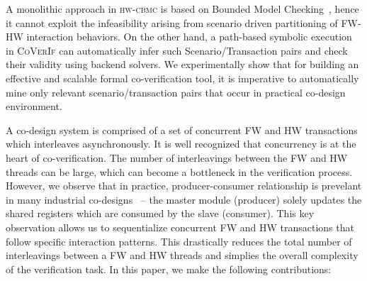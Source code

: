 \documentclass[sigconf]{acmart}
\newcommand{\tool}[1]{\textsc{#1}\xspace}
\newcommand{\hwcbmcv}{\tool{hw-cbmc}}
\newcommand{\verifox}{\tool{CoVerIf}}
\begin{document}
A monolithic approach in \hwcbmcv is based on Bounded Model Checking~\cite{CKY03}, 
hence it cannot exploit the infeasibility arising from scenario driven
partitioning of FW-HW interaction behaviors.  On the other hand, a 
path-based symbolic execution in \verifox can automatically infer 
such Scenario/Transaction pairs and check their validity using backend 
solvers.  We experimentally show that for building an effective and 
scalable formal co-verification tool, it is imperative to automatically 
mine only relevant scenario/transaction pairs that occur in practical 
co-design environment. 
%


A co-design system is comprised of a set of concurrent FW and HW transactions 
which interleaves asynchronously. It is well recognized that concurrency is at
the heart of co-verification. The number of interleavings between the FW
and HW threads can be large, which can become a bottleneck in the
verification process.  However, we observe that in practice, 
producer-consumer relationship is prevelant in many industrial 
co-designs~\cite{polig2014micro,polig2014fpl,giefers2015accelerating} --
the master module (producer) solely updates the shared registers which are
consumed by the slave (consumer).  This key observation allows us to
sequentialize concurrent FW and HW transactions that follow specific interaction
patterns.  This drastically reduces the total number of interleavings 
between a FW and HW threads and simplies the overall complexity of the 
verification task. 
%
In this paper, we make the following contributions:
\end{document}
